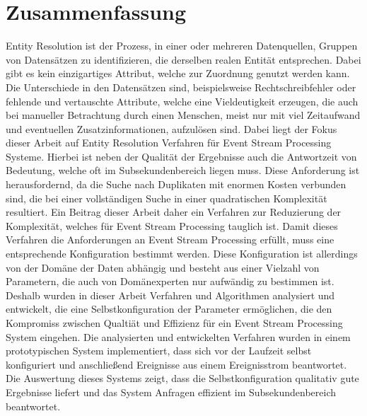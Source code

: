 %
\chapter*{Zusammenfassung}
\label{sec:abstract}
\vspace*{-10mm}

Entity Resolution ist der Prozess, in einer oder mehreren Datenquellen,
Gruppen von Datensätzen zu identifizieren, die derselben realen Entität
entsprechen. Dabei gibt es kein einzigartiges Attribut, welche zur
Zuordnung genutzt werden kann. Die Unterschiede in den Datensätzen sind,
beispielsweise Rechtschreibfehler oder fehlende und vertauschte Attribute,
welche eine Vieldeutigkeit erzeugen, die auch bei manueller Betrachtung
durch einen Menschen, meist nur mit viel Zeitaufwand und eventuellen
Zusatzinformationen, aufzulösen sind. Dabei liegt der Fokus dieser Arbeit
auf Entity Resolution Verfahren für Event Stream Processing Systeme.
Hierbei ist neben der Qualität der Ergebnisse auch die Antwortzeit von
Bedeutung, welche oft im Subsekundenbereich liegen muss. Diese Anforderung
ist herausfordernd, da die Suche nach Duplikaten mit enormen Kosten
verbunden sind, die bei einer vollständigen Suche in einer quadratischen
Komplexität resultiert. Ein Beitrag dieser Arbeit daher ein Verfahren zur
Reduzierung der Komplexität, welches für Event Stream Processing tauglich
ist. Damit dieses Verfahren die Anforderungen an Event Stream Processing
erfüllt, muss eine entsprechende Konfiguration bestimmt werden. Diese
Konfiguration ist allerdings von der Domäne der Daten abhängig und besteht
aus einer Vielzahl von Parametern, die auch von Domänexperten nur
aufwändig zu bestimmen ist. Deshalb wurden in dieser Arbeit Verfahren und
Algorithmen analysiert und entwickelt, die eine Selbstkonfiguration der
Parameter ermöglichen, die den Kompromiss zwischen Qualtiät und Effizienz
für ein Event Stream Processing System eingehen. Die analysierten und
entwickelten Verfahren wurden in einem prototypischen System
implementiert, dass sich vor der Laufzeit selbst konfiguriert und
anschließend Ereignisse aus einem Ereignisstrom beantwortet. Die
Auswertung dieses Systems zeigt, dass die Selbstkonfiguration qualitativ
gute Ergebnisse liefert und das System Anfragen effizient im
Subsekundenbereich beantwortet.
